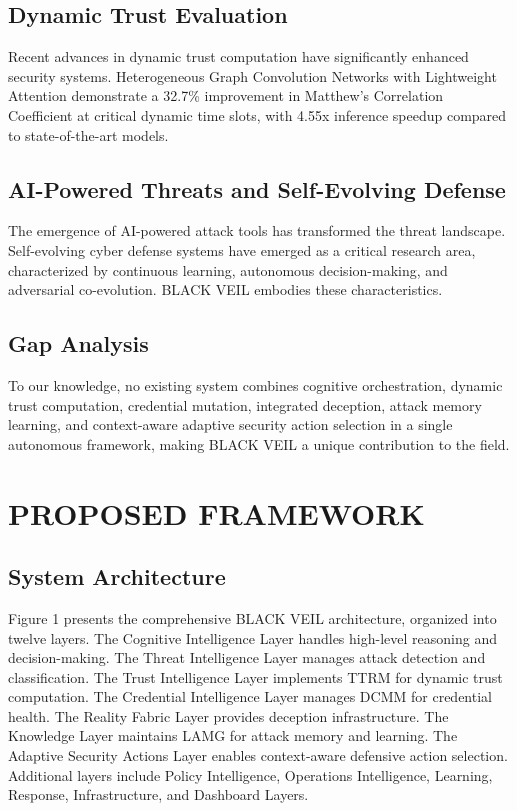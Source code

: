 \documentclass[12pt]{article}
\begin{document}
\subsection{Dynamic Trust Evaluation}
Recent advances in dynamic trust computation have significantly enhanced security systems. Heterogeneous Graph Convolution Networks with Lightweight Attention demonstrate a 32.7\% improvement in Matthew's Correlation Coefficient at critical dynamic time slots, with 4.55x inference speedup compared to state-of-the-art models.

\subsection{AI-Powered Threats and Self-Evolving Defense}
The emergence of AI-powered attack tools has transformed the threat landscape. Self-evolving cyber defense systems have emerged as a critical research area, characterized by continuous learning, autonomous decision-making, and adversarial co-evolution. BLACK VEIL embodies these characteristics.

\subsection{Gap Analysis}
To our knowledge, no existing system combines cognitive orchestration, dynamic trust computation, credential mutation, integrated deception, attack memory learning, and context-aware adaptive security action selection in a single autonomous framework, making BLACK VEIL a unique contribution to the field.

\newpage

\section{PROPOSED FRAMEWORK}

\subsection{System Architecture}
Figure 1 presents the comprehensive BLACK VEIL architecture, organized into twelve layers. The Cognitive Intelligence Layer handles high-level reasoning and decision-making. The Threat Intelligence Layer manages attack detection and classification. The Trust Intelligence Layer implements TTRM for dynamic trust computation. The Credential Intelligence Layer manages DCMM for credential health. The Reality Fabric Layer provides deception infrastructure. The Knowledge Layer maintains LAMG for attack memory and learning. The Adaptive Security Actions Layer enables context-aware defensive action selection. Additional layers include Policy Intelligence, Operations Intelligence, Learning, Response, Infrastructure, and Dashboard Layers.
\end{document}
